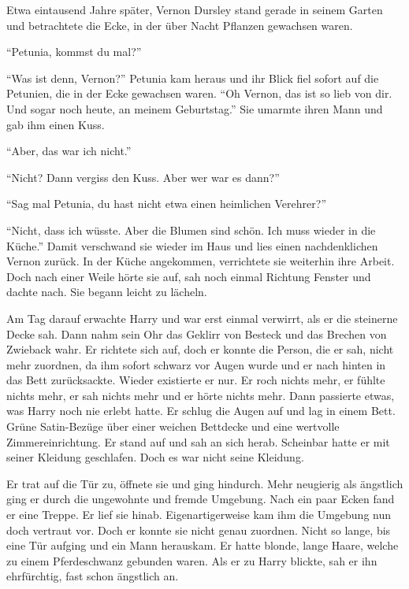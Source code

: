 \trenn

Etwa eintausend Jahre später, Vernon Dursley stand gerade in seinem Garten und betrachtete die Ecke, in der über Nacht Pflanzen gewachsen waren.

\enquote{Petunia, kommst du mal?}

\enquote{Was ist denn, Vernon?} Petunia kam heraus und ihr Blick fiel sofort auf die Petunien, die in der Ecke gewachsen waren. \enquote{Oh Vernon, das ist so lieb von dir. Und sogar noch heute, an meinem Geburtstag.} Sie umarmte ihren Mann und gab ihm einen Kuss.

\enquote{Aber, das war ich nicht.}

\enquote{Nicht? Dann vergiss den Kuss. Aber wer war es dann?}

\enquote{Sag mal Petunia, du hast nicht etwa einen heimlichen Verehrer?}

\enquote{Nicht, dass ich wüsste. Aber die Blumen sind schön. Ich muss wieder in die Küche.} Damit verschwand sie wieder im Haus und lies einen nachdenklichen Vernon zurück. In der Küche angekommen, verrichtete sie weiterhin ihre Arbeit. Doch nach einer Weile hörte sie auf, sah noch einmal Richtung Fenster und dachte nach.  Sie begann leicht zu lächeln. 

Am Tag darauf erwachte Harry und war erst einmal verwirrt, als er die steinerne Decke sah. Dann nahm sein Ohr das Geklirr von Besteck und das Brechen von Zwieback wahr. Er richtete sich auf, doch er konnte die Person, die er sah, nicht mehr zuordnen, da ihm sofort schwarz vor Augen wurde und er nach hinten in das Bett zurücksackte. Wieder existierte er nur. Er roch nichts mehr, er fühlte nichts mehr, er sah nichts mehr und er hörte nichts mehr. Dann passierte etwas, was Harry noch nie erlebt hatte. Er schlug die Augen auf und lag in einem Bett. Grüne Satin-Bezüge über einer weichen Bettdecke und eine wertvolle Zimmereinrichtung. Er stand auf und sah an sich herab. Scheinbar hatte er mit seiner Kleidung geschlafen. Doch es war nicht seine Kleidung.

Er trat auf die Tür zu, öffnete sie und ging hindurch. Mehr neugierig als ängstlich ging er durch die ungewohnte und fremde Umgebung. Nach ein paar Ecken fand er eine Treppe. Er lief sie hinab. Eigenartigerweise kam ihm die Umgebung nun doch vertraut vor. Doch er konnte sie nicht genau zuordnen. Nicht so lange, bis eine Tür aufging und ein Mann herauskam. Er hatte blonde, lange Haare, welche zu einem Pferdeschwanz gebunden waren. Als er zu Harry blickte, sah er ihn ehrfürchtig, fast schon ängstlich an.

